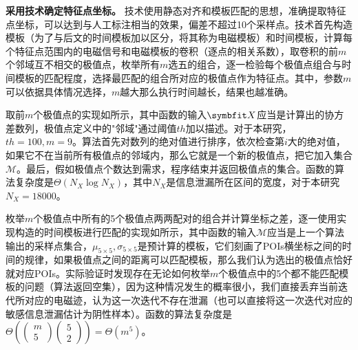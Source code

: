 {{	%
	
	\textbf{采用\yuchuli 技术确定特征点坐标。}
	\yuchuli 技术使用静态对齐和模板匹配的思想，准确提取特征点坐标，可以达到与人工标注相当的效果，偏差不超过10个采样点。\yuchuli 技术首先构造模板（为了与后文的时间模板加以区分，将其称为电磁模板）和时间模板，计算每个特征点范围内的电磁信号和电磁模板的卷积（逐点的相关系数），取卷积的前$m$个邻域互不相交的极值点，枚举所有$m$选五的组合，逐一检验每个极值点组合与时间模板的匹配程度，选择最匹配的组合所对应的极值点作为特征点。其中，参数$m$可以依据具体情况选择，$m$越大那么执行时间越长，结果也越准确。
	
	取前$m$个极值点的实现如所示，其中函数的输入$\Vector X$应当是计算出的协方差数列，极值点定义中的"邻域"通过阈值$th$加以描述。对于本研究，$th=100,m=9$。算法首先对数列的绝对值进行排序，依次检查第$i$大的绝对值，如果它不在当前所有极值点的邻域内，那么它就是一个新的极值点，把它加入集合$\mathcal M$。最后，假如极值点个数达到需求，程序结束并返回极值点的集合。函数的算法复杂度是$\Theta(N_X\log N_X)$，其中$N_X$是信息泄漏所在区间的宽度，对于本研究$N_X=18000$。
	
	枚举$m$个极值点中所有的5个极值点两两配对的组合并计算坐标之差，逐一使用实现构造的时间模板进行匹配的实现如所示，其中函数的输入$\mathcal M$应当是上一个算法输出的采样点集合，$\mu_{5\times5},\sigma_{5\times5}$是预计算的模板，它们刻画了POIs横坐标之间的时间的规律，如果极值点之间的距离可以匹配模板，那么我们认为选出的极值点恰好就对应POIs。实际验证时发现存在无论如何枚举$m$个极值点中的5个都不能匹配模板的问题（算法返回空集），因为这种情况发生的概率很小，我们直接丢弃当前迭代所对应的电磁迹，认为这一次迭代不存在泄漏（也可以直接将这一次迭代对应的敏感信息泄漏估计为阴性样本）。函数的算法复杂度是$\Theta\left( \begin{pmatrix}m\\5\end{pmatrix}\begin{pmatrix}5\\2\end{pmatrix}\right) =\Theta(m^5)$。
	
}}
